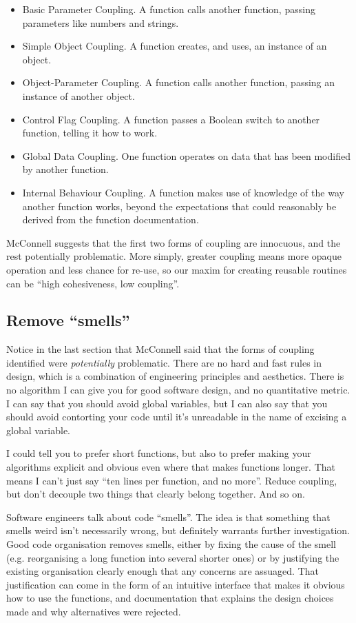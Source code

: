 \documentclass[a4paper]{article}
\begin{document}
\begin{itemize}
\item Basic Parameter Coupling. A function calls another function, passing parameters like numbers and strings.
\item Simple Object Coupling. A function creates, and uses, an instance of an object.
\item Object-Parameter Coupling. A function calls another function, passing an instance of another object.
\item Control Flag Coupling. A function passes a Boolean switch to another function, telling it how to work.
\item Global Data Coupling. One function operates on data that has been modified by another function.
\item Internal Behaviour Coupling. A function makes use of knowledge of the way another function works, beyond the expectations that could reasonably be derived from the function documentation.
\end{itemize}

McConnell suggests that the first two forms of coupling are innocuous, and the rest potentially problematic. More simply, greater coupling means more opaque operation and less chance for re-use, so our maxim for creating reusable routines can be ``high cohesiveness, low coupling''.

\subsection{Remove ``smells''}

Notice in the last section that McConnell said that the forms of coupling identified were \emph{potentially} problematic. There are no hard and fast rules in design, which is a combination of engineering principles and aesthetics. There is no algorithm I can give you for good software design, and no quantitative metric. I can say that you should avoid global variables, but I can also say that you should avoid contorting your code until it's unreadable in the name of excising a global variable.

I could tell you to prefer short functions, but also to prefer making your algorithms explicit and obvious even where that makes functions longer. That means I can't just say ``ten lines per function, and no more''. Reduce coupling, but don't decouple two things that clearly belong together. And so on.

Software engineers talk about code ``smells''\cite{chsmell}. The idea is that something that smells weird isn't necessarily wrong, but definitely warrants further investigation. Good code organisation removes smells, either by fixing the cause of the smell (e.g. reorganising a long function into several shorter ones) or by justifying the existing organisation clearly enough that any concerns are assuaged. That justification can come in the form of an intuitive interface that makes it obvious how to use the functions, and documentation that explains the design choices made and why alternatives were rejected.
\end{document}
